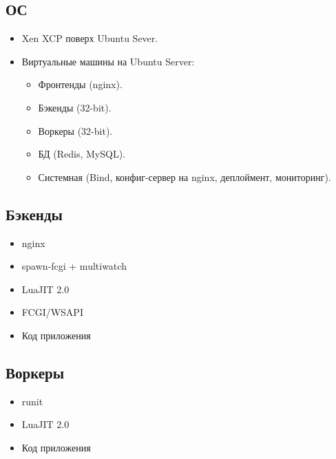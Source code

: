\documentclass[aspectratio=169,handout,bigger]{beamer}
\begin{document}

\subsection*{ОС}

\begin{frame}
  \begin{itemize}
    \item Xen XCP поверх Ubuntu Sever.
    \item Виртуальные машины на Ubuntu Server:
    \begin{itemize}
      \item Фронтенды (nginx).
      \item Бэкенды (32-bit).
      \item Воркеры (32-bit).
      \item БД (Redis, MySQL).
      \item Системная (Bind, конфиг-сервер на nginx, деплоймент, мониторинг).
    \end{itemize}
  \end{itemize}
\end{frame}


\subsection*{Бэкенды}

\begin{frame}
  \begin{itemize}
    \item nginx
    \item spawn-fcgi + multiwatch
    \item LuaJIT 2.0
    \item FCGI/WSAPI
    \item Код приложения
  \end{itemize}
\end{frame}


\subsection*{Воркеры}

\begin{frame}
  \begin{itemize}
    \item runit
    \item LuaJIT 2.0
    \item Код приложения
  \end{itemize}
\end{frame}
\end{document}
